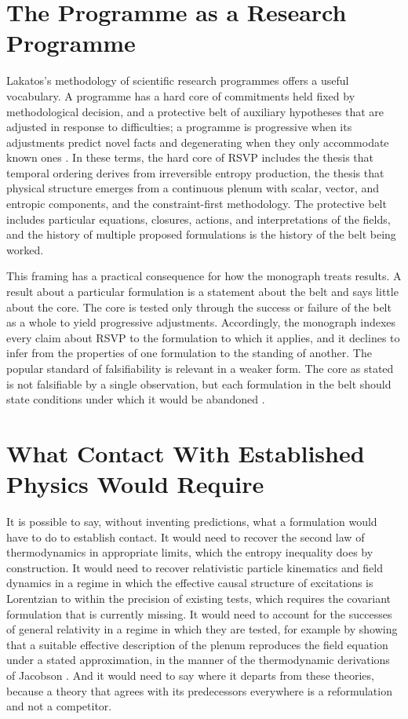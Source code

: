 \documentclass[11pt,twoside,openright]{book}
\theoremstyle{plain}
\theoremstyle{definition}
\theoremstyle{remark}
\newcommand{\rsvp}{RSVP}
\begin{document}
\section{The Programme as a Research Programme}

Lakatos's methodology of scientific research programmes offers a useful vocabulary. A programme has a hard core of commitments held fixed by methodological decision, and a protective belt of auxiliary hypotheses that are adjusted in response to difficulties; a programme is progressive when its adjustments predict novel facts and degenerating when they only accommodate known ones \cite{lakatos1970}. In these terms, the hard core of \rsvp{} includes the thesis that temporal ordering derives from irreversible entropy production, the thesis that physical structure emerges from a continuous plenum with scalar, vector, and entropic components, and the constraint-first methodology. The protective belt includes particular equations, closures, actions, and interpretations of the fields, and the history of multiple proposed formulations is the history of the belt being worked.

This framing has a practical consequence for how the monograph treats results. A result about a particular formulation is a statement about the belt and says little about the core. The core is tested only through the success or failure of the belt as a whole to yield progressive adjustments. Accordingly, the monograph indexes every claim about \rsvp{} to the formulation to which it applies, and it declines to infer from the properties of one formulation to the standing of another. The popular standard of falsifiability is relevant in a weaker form. The core as stated is not falsifiable by a single observation, but each formulation in the belt should state conditions under which it would be abandoned \cite{popper1959}.

\section{What Contact With Established Physics Would Require}

It is possible to say, without inventing predictions, what a formulation would have to do to establish contact. It would need to recover the second law of thermodynamics in appropriate limits, which the entropy inequality does by construction. It would need to recover relativistic particle kinematics and field dynamics in a regime in which the effective causal structure of excitations is Lorentzian to within the precision of existing tests, which requires the covariant formulation that is currently missing. It would need to account for the successes of general relativity in a regime in which they are tested, for example by showing that a suitable effective description of the plenum reproduces the field equation under a stated approximation, in the manner of the thermodynamic derivations of Jacobson \cite{jacobson1995}. And it would need to say where it departs from these theories, because a theory that agrees with its predecessors everywhere is a reformulation and not a competitor.
\end{document}
